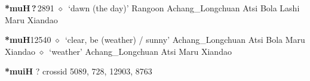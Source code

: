 \begin{list}{}{\leftmargin=1.5em \itemindent=-1.5em}
  \item {\footnotesize \textbf{*muH\,?\,}}{\tiny 2891}
\hspace{1ex}
         $\diamond$~`dawn (the day)'
         Rangoon 
\hspace{1ex}
         Achang\_Longchuan 
\hspace{1ex}
         Atsi 
\hspace{1ex}
         Bola 
\hspace{1ex}
         Lashi 
\hspace{1ex}
         Maru 
\hspace{1ex}
         Xiandao 
  \item {\footnotesize \textbf{*muH}}{\tiny 12540}
\hspace{1ex}
         $\diamond$~`clear, be (weather) / sunny'
         Achang\_Longchuan 
\hspace{1ex}
         Atsi 
\hspace{1ex}
         Bola 
\hspace{1ex}
         Maru 
\hspace{1ex}
         Xiandao 
\hspace{1ex}
         $\diamond$~`weather'
         Achang\_Longchuan 
\hspace{1ex}
         Atsi 
\hspace{1ex}
         Maru 
\hspace{1ex}
         Xiandao 
  \end{list}
\item
\textbf{*muiH}
?
  {\tiny crossid 5089, 728, 12903, 8763}
